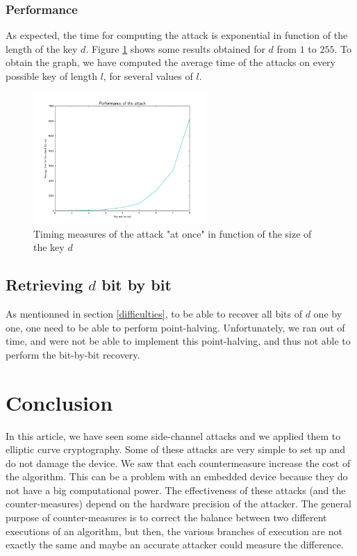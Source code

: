 \documentclass[journal]{IEEEtran}
\begin{document}
\subsubsection{Performance}
\label{perf-all}
As expected, the time for computing the attack is exponential in function of the length of the key $d$. Figure \ref{first-attack-perf} shows some results obtained for $d$ from $1$ to $255$. 
To obtain the graph, we have computed the average time of the attacks on every possible key of length $l$, for several values of $l$.

\begin{figure}
    \centering
    \includegraphics[width=250px]{img/first-attack-perf.png}
    \caption{Timing measures of the attack "at once" in function of the size of the key $d$}
    \label{first-attack-perf}
\end{figure}   


\subsection{Retrieving $d$ bit by bit}
As mentionned in section \ref{difficulties}, to be able to recover all bits of $d$ one by one, one need to be able to perform point-halving.
Unfortunately, we ran out of time, and were not be able to implement this point-halving, and thus not able to perform the bit-by-bit recovery.

\section{Conclusion}

In this article, we have seen some side-channel attacks and we applied them to elliptic curve cryptography. Some of these attacks are very simple to set up and do not damage the device. We saw that each countermeasure increase the cost of the algorithm. This can be a problem with an embedded device because they do not have a big computational power. The effectiveness of these attacks (and the counter-measures) depend on the hardware precision of the attacker. The general purpose of counter-measures is to correct the balance between two different executions of an algorithm, but then, the various branches of execution are not exactly the same and maybe an accurate attacker could measure the difference.
\end{document}
